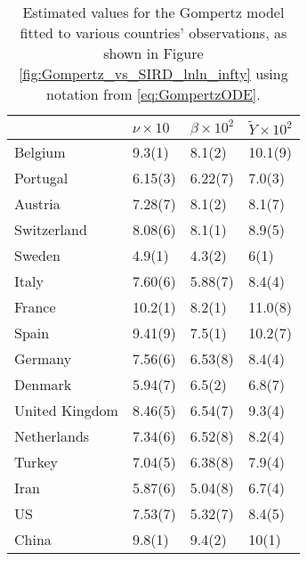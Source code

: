 \documentclass{article}
\begin{document}
\begin{table}[H]
\label{tab:gomp}
\centering
\caption{Estimated values for the Gompertz model fitted to various countries' observations, as shown in Figure \ref{fig:Gompertz_vs_SIRD_lnln_infty} using notation from \ref{eq:GompertzODE}.}
\begin{tabular}{llll}
\toprule
{} &             $\nu\times 10$ &           $\beta\times 10^{2}$ &        $\tilde{Y}\times 10^{2}$ \\
\midrule
Belgium        &   9.3(1) &   8.1(2) &  10.1(9) \\
Portugal       &  6.15(3) &  6.22(7) &   7.0(3) \\
Austria        &  7.28(7) &   8.1(2) &   8.1(7) \\
Switzerland    &  8.08(6) &   8.1(1) &   8.9(5) \\
Sweden         &   4.9(1) &   4.3(2) &     6(1) \\
Italy          &  7.60(6) &  5.88(7) &   8.4(4) \\
France         &  10.2(1) &   8.2(1) &  11.0(8) \\
Spain          &  9.41(9) &   7.5(1) &  10.2(7) \\
Germany        &  7.56(6) &  6.53(8) &   8.4(4) \\
Denmark        &  5.94(7) &   6.5(2) &   6.8(7) \\
United Kingdom &  8.46(5) &  6.54(7) &   9.3(4) \\
Netherlands    &  7.34(6) &  6.52(8) &   8.2(4) \\
Turkey         &  7.04(5) &  6.38(8) &   7.9(4) \\
Iran           &  5.87(6) &  5.04(8) &   6.7(4) \\
US             &  7.53(7) &  5.32(7) &   8.4(5) \\
China          &   9.8(1) &   9.4(2) &    10(1) \\
\bottomrule
\end{tabular}

\end{table}



\end{document}
